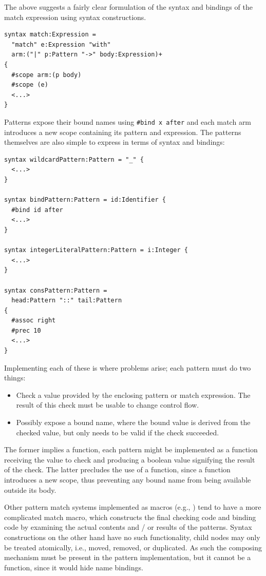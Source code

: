 \documentclass{kththesis}
\begin{document}
The above suggests a fairly clear formulation of the syntax and bindings of the match expression using syntax constructions.

\begin{verbatim}
syntax match:Expression =
  "match" e:Expression "with"
  arm:("|" p:Pattern "->" body:Expression)+
{
  #scope arm:(p body)
  #scope (e)
  <...>
}
\end{verbatim}

Patterns expose their bound names using \texttt{#bind x after} and each match arm introduces a new scope containing its pattern and expression. The patterns themselves are also simple to express in terms of syntax and bindings:

\begin{verbatim}
syntax wildcardPattern:Pattern = "_" {
  <...>
}

syntax bindPattern:Pattern = id:Identifier {
  #bind id after
  <...>
}

syntax integerLiteralPattern:Pattern = i:Integer {
  <...>
}

syntax consPattern:Pattern =
  head:Pattern "::" tail:Pattern
{
  #assoc right
  #prec 10
  <...>
}
\end{verbatim}


Implementing each of these is where problems arise; each pattern must do two things:

\begin{itemize}
  \item Check a value provided by the enclosing pattern or match expression. The result of this check must be usable to change control flow.
  \item Possibly expose a bound name, where the bound value is derived from the checked value, but only needs to be valid if the check succeeded.
\end{itemize}

The former implies a function, each pattern might be implemented as a function receiving the value to check and producing a boolean value signifying the result of the check. The latter precludes the use of a function, since a function introduces a new scope, thus preventing any bound name from being available outside its body.

Other pattern match systems implemented as macros (e.g., \cite{Tobin-Hochstadt2011Extensible-Patt}) tend to have a more complicated match macro, which constructs the final checking code and binding code by examining the actual contents and / or results of the patterns. Syntax constructions on the other hand have no such functionality, child nodes may only be treated atomically, i.e., moved, removed, or duplicated. As such the composing mechanism must be present in the pattern implementation, but it cannot be a function, since it would hide name bindings.
\end{document}
